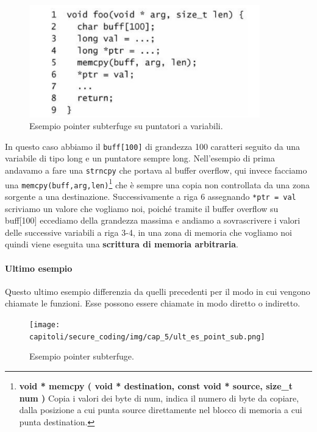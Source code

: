 \begin{figure}[H]
	\centering
	\includegraphics[width=10cm, keepaspectratio]{capitoli/secure_coding/img/cap_5/es_pointer_var.png}
	\caption{Esempio pointer subterfuge su puntatori a variabili.}\label{fig:es_poin_var}
\end{figure}

In questo caso abbiamo il \verb|buff[100]| di grandezza 100 caratteri seguito da
una variabile di tipo long e un puntatore sempre long. Nell'esempio di prima andavamo a
fare una \verb|strncpy| che portava al buffer overflow, qui invece facciamo
una \verb|memcpy(buff,arg,len)|\footnote{\textbf{void * memcpy ( void * destination,
		const void * source, size\_t num )}  Copia i valori dei byte di num, indica il numero di
	byte da copiare, dalla posizione a cui punta source direttamente nel blocco di memoria
	a cui punta destination.} che è sempre una copia non controllata da una zona sorgente
a una destinazione. Successivamente a riga 6 assegnando \verb|*ptr = val| scriviamo
un valore che vogliamo noi, poiché tramite il buffer overflow su buff[100] eccediamo
della grandezza massima e andiamo a sovrascrivere i valori delle successive variabili
a riga 3-4, in una zona di memoria che vogliamo noi quindi viene eseguita
una \textbf{scrittura di memoria arbitraria}.

\paragraph{Ultimo esempio}
Questo ultimo esempio differenzia da quelli precedenti per il modo in cui vengono
chiamate le funzioni. Esse possono essere chiamate in modo diretto o indiretto.

\begin{figure}[H]
	\centering
	\texttt{[image: capitoli/secure\_coding/img/cap\_5/ult\_es\_point\_sub.png]}
	\caption{Esempio pointer subterfuge.}\label{fig:ult_es_poin}
\end{figure}

